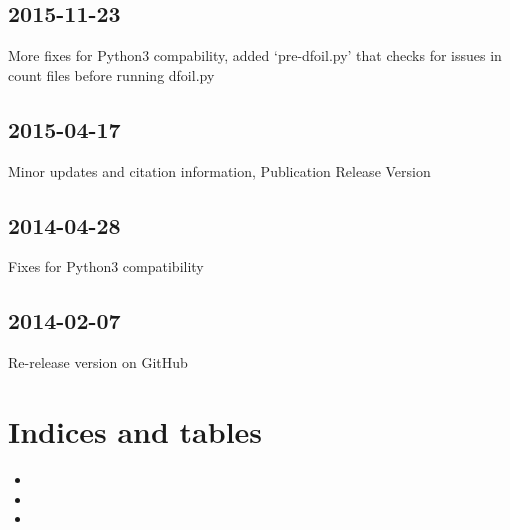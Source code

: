 \documentclass[letterpaper,12pt,english]{sphinxmanual}
\begin{document}
\section{2015-11-23}
\label{\detokenize{releases:id4}}
More fixes for Python3 compability, added ‘pre-dfoil.py’ that checks for issues in count files before running dfoil.py


\section{2015-04-17}
\label{\detokenize{releases:id5}}
Minor updates and citation information, Publication Release Version


\section{2014-04-28}
\label{\detokenize{releases:id6}}
Fixes for Python3 compatibility


\section{2014-02-07}
\label{\detokenize{releases:id7}}
Re-release version on GitHub


\chapter{Indices and tables}
\label{\detokenize{index:indices-and-tables}}\begin{itemize}
\item {} 

\item {} 

\item {} 

\end{itemize}



\renewcommand{\indexname}{Index}
\printindex
\end{document}
